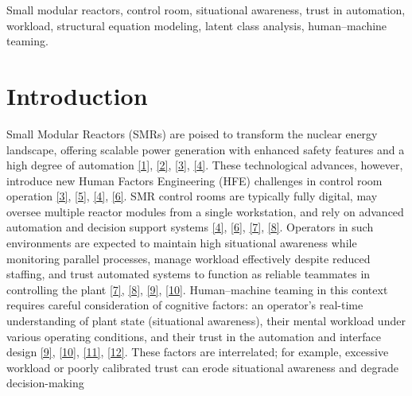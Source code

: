 \documentclass[conference]{IEEEtran}
\begin{document}
\begin{IEEEkeywords}
Small modular reactors, control room, situational awareness, trust in automation, workload, structural equation modeling, latent class analysis, human–machine teaming.
\end{IEEEkeywords}

\section{Introduction}



Small Modular Reactors (SMRs) are poised to transform the nuclear energy landscape, offering scalable power generation with enhanced safety features and a high degree of automation \href{https://www-pub.iaea.org/MTCD/Publications/PDF/TE-1851_web.pdf}{[1]}, \href{https://www.inl.gov/content/uploads/2020/07/SMR-Handbook-2020.pdf}{[2]}, \href{https://www.nrc.gov/docs/ML1605/ML16058A440.pdf}{[3]}, \href{https://www.oecd-nea.org/upload/docs/application/pdf/2021-02/csni-r2016-17.pdf}{[4]}. These technological advances, however, introduce new Human Factors Engineering (HFE) challenges in control room operation \href{https://www.nrc.gov/docs/ML1605/ML16058A440.pdf}{[3]}, \href{https://www.sciencedirect.com/science/article/pii/S0029549324000311}{[5]}, \href{https://www.oecd-nea.org/upload/docs/application/pdf/2021-02/csni-r2016-17.pdf}{[4]}, \href{https://www.iapsam.org/PSAM16/papers/CL109-PSAM16.pdf}{[6]}. SMR control rooms are typically fully digital, may oversee multiple reactor modules from a single workstation, and rely on advanced automation and decision support systems \href{https://www.oecd-nea.org/upload/docs/application/pdf/2021-02/csni-r2016-17.pdf}{[4]}, \href{https://www.iapsam.org/PSAM16/papers/CL109-PSAM16.pdf}{[6]}, \href{https://www.tandfonline.com/doi/full/10.1080/00223131.2025.2532066}{[7]}, \href{https://pmc.ncbi.nlm.nih.gov/articles/PMC8300853/}{[8]}. Operators in such environments are expected to maintain high situational awareness while monitoring parallel processes, manage workload effectively despite reduced staffing, and trust automated systems to function as reliable teammates in controlling the plant \href{https://www.tandfonline.com/doi/full/10.1080/00223131.2025.2532066}{[7]}, \href{https://pmc.ncbi.nlm.nih.gov/articles/PMC8300853/}{[8]}, \href{https://www.sciencedirect.com/science/article/pii/S1738573315002247}{[9]}, \href{https://pubmed.ncbi.nlm.nih.gov/38695711/}{[10]}. Human–machine teaming in this context requires careful consideration of cognitive factors: an operator’s real-time understanding of plant state (situational awareness), their mental workload under various operating conditions, and their trust in the automation and interface design \href{https://www.sciencedirect.com/science/article/pii/S1738573315002247}{[9]}, \href{https://pubmed.ncbi.nlm.nih.gov/38695711/}{[10]}, \href{https://journals.sagepub.com/doi/10.1518/001872095779049543}{[11]}, \href{https://www.sciencedirect.com/science/article/pii/S2351978915002747}{[12]}. These factors are interrelated; for example, excessive workload or poorly calibrated trust can erode situational awareness and degrade decision-making 
\end{document}
